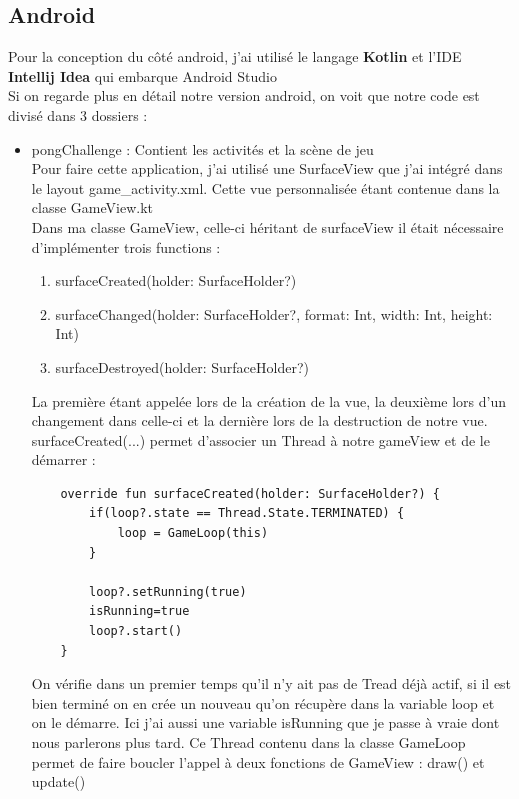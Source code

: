\documentclass{article}
\begin{document}
\subsection{Android}
Pour la conception du côté android, j'ai utilisé le langage \textbf{Kotlin} et l'IDE \textbf{Intellij Idea} qui embarque Android Studio \\
Si on regarde plus en détail notre version android, on voit que notre code est divisé dans 3 dossiers : 
\begin{itemize}
    \item pongChallenge : Contient les activités et la scène de jeu \\
    Pour faire cette application, j'ai utilisé une SurfaceView que j'ai intégré dans le layout game\_activity.xml. Cette vue personnalisée étant contenue dans la classe GameView.kt\\
    
    Dans ma classe GameView, celle-ci héritant de surfaceView il était nécessaire d'implémenter trois functions : 
    \begin{enumerate}
        \item surfaceCreated(holder: SurfaceHolder?) 
        \item surfaceChanged(holder: SurfaceHolder?, format: Int, width: Int, height: Int)
        \item surfaceDestroyed(holder: SurfaceHolder?)
    \end{enumerate}
    La première étant appelée lors de la création de la vue, la deuxième lors d'un changement dans celle-ci et la dernière lors de la destruction de notre vue.\\
    surfaceCreated(...) permet d'associer un Thread à notre gameView et de le démarrer : 
    \begin{verbatim}
    override fun surfaceCreated(holder: SurfaceHolder?) {
        if(loop?.state == Thread.State.TERMINATED) {
            loop = GameLoop(this)
        }

        loop?.setRunning(true)
        isRunning=true
        loop?.start()
    }
    \end{verbatim}
    On vérifie dans un premier temps qu'il n'y ait pas de Tread déjà actif, si il est bien terminé on en crée un nouveau qu'on récupère dans la variable loop et on le démarre. Ici j'ai aussi une variable isRunning que je passe à vraie dont nous parlerons plus tard. 
    Ce Thread contenu dans la classe GameLoop permet de faire boucler l'appel à deux fonctions de GameView : draw() et update() \\ 
    

\end{itemize}
\end{document}
